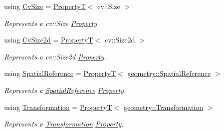 \begin{DoxyCompactItemize}
using \hyperlink{group___geometry_properties_ga6c3ae9a94a21cad03ae025518ed4376c}{Cv\+Size} = \hyperlink{structdg_1_1deepcore_1_1_property_t}{PropertyT}$<$ cv\+::\+Size $>$
\begin{DoxyCompactList}\small\item\em Represents a {\ttfamily cv\+::\+Size} \hyperlink{classdg_1_1deepcore_1_1_property}{Property}. \end{DoxyCompactList}\item 
using \hyperlink{group___geometry_properties_gab05ab73bf2f4d38593c25af9928dd476}{Cv\+Size2d} = \hyperlink{structdg_1_1deepcore_1_1_property_t}{PropertyT}$<$ cv\+::\+Size2d $>$
\begin{DoxyCompactList}\small\item\em Represents a {\ttfamily cv\+::\+Size2d} \hyperlink{classdg_1_1deepcore_1_1_property}{Property}. \end{DoxyCompactList}\item 
using \hyperlink{group___geometry_properties_gae23c0f56a7a0e1cf724aaddb7aa3727f}{Spatial\+Reference} = \hyperlink{structdg_1_1deepcore_1_1_property_t}{PropertyT}$<$ \hyperlink{classdg_1_1deepcore_1_1geometry_1_1_spatial_reference}{geometry\+::\+Spatial\+Reference} $>$
\begin{DoxyCompactList}\small\item\em Represents a \hyperlink{classdg_1_1deepcore_1_1geometry_1_1_spatial_reference}{Spatial\+Reference} \hyperlink{classdg_1_1deepcore_1_1_property}{Property}. \end{DoxyCompactList}\item 
using \hyperlink{group___geometry_properties_gaee5fb371295b38850e2e6eabd04be3b3}{Transformation} = \hyperlink{structdg_1_1deepcore_1_1_property_t}{PropertyT}$<$ \hyperlink{structdg_1_1deepcore_1_1geometry_1_1_transformation}{geometry\+::\+Transformation} $>$
\begin{DoxyCompactList}\small\item\em Represents a \hyperlink{structdg_1_1deepcore_1_1geometry_1_1_transformation}{Transformation} \hyperlink{classdg_1_1deepcore_1_1_property}{Property}. \end{DoxyCompactList}\end{DoxyCompactItemize}
